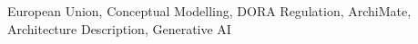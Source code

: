 \acresetall
\noindent European Union, Conceptual Modelling, DORA Regulation, ArchiMate, Architecture Description, Generative AI